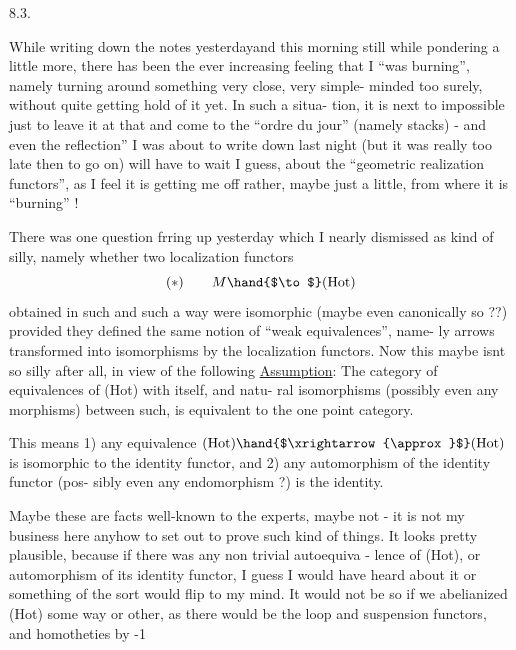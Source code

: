 
8.3.

 While writing down the notes yesterday\hand{,}and this morning still while
pondering a little more, there has been the ever increasing feeling that
I ``was burning'', namely turning around something very close, very simple-%
minded too surely, without quite getting hold of it yet. In such a situa-%
tion, it is next to impossible just to leave it at that and come to the
``ordre du jour'' (namely stacks) - and even the  reflection'' I was about
to write down last night (but it was really too late then to go on) will
have to wait I guess, about the ``geometric realization functors'', as I
feel it is getting me off rather, maybe just a little, from where it is
``burning'' !

There was one question frring up yesterday  which I nearly
dismissed as kind of silly, namely whether two localization functors
\[ (*) \qquad M \hand{$\to$} (\mathrm{Hot}) \]
obtained in such and such a way were isomorphic (maybe even canonically
so ??) provided they defined the same notion of ``weak equivalences'', name-%
ly arrows transformed into isomorphisms by the localization functors. Now
this maybe isnt so silly after all, in view of the following
\uline{Assumption}: The category of equivalences of (Hot) with itself, and  natu-%
ral isomorphisms (possibly even any morphisms) between such, is equivalent
to the one point category.

This means 1) any equivalence $(\mathrm{Hot})\hand{$\xrightarrow{\approx}$}(\mathrm{Hot})$ is isomorphic to the
identity functor, and 2) any automorphism of the identity functor (pos-%
sibly even any endomorphism ?) is the identity.

Maybe these are facts well-known to the experts, maybe not - it is
not my business here anyhow to set out to prove such kind of things. It
looks pretty plausible, because if there was any non trivial autoequiva -
lence of (Hot), or automorphism of its identity functor, I guess I would
have heard about it\hand{,} or something of the sort would flip to my mind. It
would not be so if we abelianized (Hot) some way or other, as there would
be the loop and suspension functors, and homotheties by -1  

